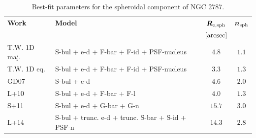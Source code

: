 \documentclass[preprint2]{emulateapj}
\begin{document}
\begin{figure}[h]
\begin{center}
{  %
  }
  \end{center}
  \end{figure}

  \begin{table}[h]
  \small
  \caption{Best-fit parameters for the spheroidal component of NGC 2787.}
  \begin{center}
  \begin{tabular}{llcc}
  \hline
  {\bf Work} & {\bf Model}   & $\bm R_{\rm e,sph}$    & $\bm n_{\rm sph}$ \\
    &  &  $[\rm arcsec]$ & \\
  \hline
  T.W. 1D maj. & S-bul + e-d + F-bar + F-id + PSF-nucleus & $4.8$  &  $1.1$ \\
  T.W. 1D eq.  & S-bul + e-d + F-bar + F-id + PSF-nucleus & $3.3$  &  $1.3$ \\
  \hline
  GD07         & S-bul + e-d					  & $4.6$   &  $2.0$ \\
  L+10         & S-bul + e-d + F-bar + F-l			  & $4.0$   &  $1.3$ \\
  S+11         & S-bul + e-d + G-bar + G-n			  & $15.7$  &  $3.0$ \\
  L+14         & S-bul + trunc. e-d + trunc. S-bar + S-id + PSF-n & $14.3$  &  $2.8$ \\
  \hline
  \end{tabular}
  \end{center}
  \label{tab:n2787}
  \end{table}
\end{document}
